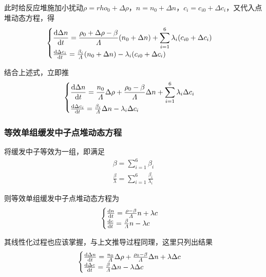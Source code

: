 此时给反应堆施加小扰动$\rho = rho_0 + \Delta \rho$，$n = n_0 + \Delta n$，$c_{i} = c_{i0} + \Delta c_{i}$，又代入点堆动态方程，得
\begin{equation}
    \begin{cases} \displaystyle
        \frac{{\rm{d}}{\Delta n}}{{\rm{d}}{t}} = \frac{\rho_0 + \Delta \rho - \beta}{\varLambda} (n_0 + \Delta n) + \sum_{i=1}^{6} \lambda_i (c_{i0} + \Delta c_i) \\
        \frac{{\rm{d}}{\Delta c_i}}{{\rm{d}}{t}} = \frac{\beta_i}{\varLambda} (n_0 + \Delta n) - \lambda_i (c_{i0} + \Delta c_i)
    \end{cases}
\end{equation}

结合上述式，立即推
\begin{equation}
    \begin{cases} \displaystyle
        \frac{{\rm{d}}{\Delta n}}{{\rm{d}}{t}} = \frac{n_0}{\varLambda}\Delta \rho + \frac{\rho_0 - \beta}{\varLambda}\Delta n + \sum_{i=1}^{6} \lambda_i \Delta c_i \\
        \frac{{\rm{d}}{\Delta c_i}}{{\rm{d}}{t}} = \frac{\beta_i}{\varLambda} \Delta n - \lambda_i \Delta c_i
    \end{cases} \label{linear equation}
\end{equation}

\subsubsection{等效单组缓发中子点堆动态方程}

将缓发中子等效为一组，即满足
\begin{align}
    \beta = \sum_{i=1}^{6} \beta_i \\
    \frac{\beta}{\lambda} = \sum_{i=1}^{6} \frac{\beta_i}{\lambda_i}
\end{align}

则等效单组缓发中子点堆动态方程为
\begin{equation}
    \begin{cases}
        \frac{{\rm{d}}{n}}{{\rm{d}}{t}} = \frac{\rho - \beta}{\varLambda}n + \lambda c \\
        \frac{{\rm{d}}{c}}{{\rm{d}}{t}} = \frac{\beta}{\varLambda}n - \lambda c
    \end{cases} \label{equal one}
\end{equation}

其线性化过程也应该掌握，与上文推导过程同理，这里只列出结果
\begin{equation}
    \begin{cases}
        \frac{{\rm{d}}{\Delta n}}{{\rm{d}}{t}} = \frac{n_0}{\varLambda}\Delta \rho + \frac{\rho_0 - \beta}{\varLambda}\Delta n + \lambda \Delta c \\
        \frac{{\rm{d}}{\Delta c}}{{\rm{d}}{t}} = \frac{\beta}{\varLambda}\Delta n - \lambda \Delta c
    \end{cases} \label{equal linear}
\end{equation}

